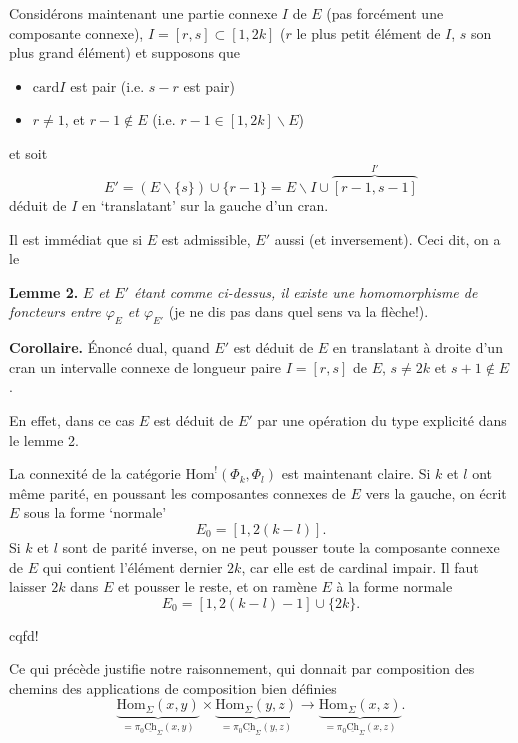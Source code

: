 \documentclass[11pt]{article}
\newcommand{\printedpage}[1]{\marginpar{\footnotesize p.~#1}}
\newcommand{\msp}[1]{\marginpar{\footnotesize [#1]}}
\newcommand{\Hom}{\mathrm{Hom}}
\newcommand{\uCh}{\underline{\mathrm{Ch}}}
\newcommand{\card}{\mathrm{card}}
\begin{document}
Considérons maintenant une partie connexe $I$ de $E$ (pas forcément une composante connexe), $I=[r,s]\subset[1,2k]$ ($r$ le plus petit élément de $I$, $s$ son plus grand élément) et supposons que

\begin{itemize}
\item[a)] $\card I$ est pair (i.e. $s-r$ est pair) 
\item[b)] $r\neq1$, et $r-1\notin E$ (i.e. $r-1\in[1,2k]\backslash E$)
\end{itemize}

et soit
\[
E'=(E\backslash\{s\})\cup\{r-1\}=E\backslash I\cup\overbrace{[r-1,s-1]}^{I'}
\]
déduit de $I$ en `translatant' sur la gauche d'un cran.

\msp{page 21}
Il est immédiat que si $E$ est admissible, $E'$ aussi (et inversement). Ceci dit, on a le

\textbf{Lemme 2.} \textit{$E$ et $E'$ étant comme ci-dessus, il existe une homomorphisme de foncteurs entre $\varphi_E$ et $\varphi_{E'}$} (je ne dis pas dans quel sens va la flèche!). %

\textbf{Corollaire.} Énoncé dual, quand $E'$ est déduit de $E$ en translatant à droite d'un cran un intervalle connexe de longueur paire $I=[r,s]$ de $E$, $s\neq2k$ et $s+1\notin E$.

En effet, dans ce cas $E$ est déduit de $E'$ par une opération du type explicité dans le lemme 2.

La connexité de la catégorie $\Hom^{!}(\Phi_k,\Phi_l)$ est maintenant claire. Si $k$ et $l$ ont même parité, en poussant les composantes connexes de $E$ vers la gauche, on écrit $E$ sous la forme `normale'
\[
E_0=[1,2(k-l)].
\]
Si $k$ et $l$ sont de parité inverse, on ne peut pousser toute la composante connexe de $E$ qui contient l'élément dernier $2k$, car elle est de cardinal impair. Il faut laisser $2k$ dans $E$ et pousser le reste, et on ramène $E$ à la forme normale
\[
E_0=[1,2(k-l)-1]\cup\{2k\}.
\]

\hfill cqfd!


\printedpage{14}
Ce qui précède justifie notre raisonnement, qui donnait par composition des chemins des applications de composition bien définies
\[
\underbrace{\Hom_\Sigma(x,y)}_{=\pi_0\uCh_\Sigma(x,y)} \times \underbrace{\Hom_\Sigma(y,z)}_{=\pi_0\uCh_\Sigma(y,z)} \longrightarrow \underbrace{\Hom_\Sigma(x,z)}_{=\pi_0\underline{\textstyle\mathrm{Ch}}_\Sigma(x,z)}.
\]
\end{document}
